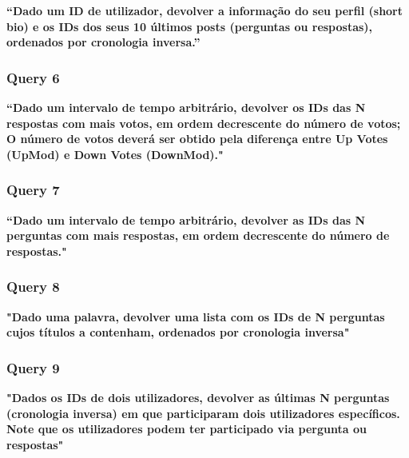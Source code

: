 \documentclass[a4paper]{article}
\begin{document}
\textbf{“Dado um ID de utilizador,  devolver a informação do
seu perfil (short bio) e os IDs dos seus 10 últimos posts (perguntas ou respostas),
ordenados por cronologia inversa.”}

\vspace{0.1cm}


\subsubsection*{Query 6}
\label{sec:query6}

\textbf{“Dado um intervalo de tempo arbitrário, devolver os IDs das N respostas
com mais votos, em ordem decrescente do número de votos; O número de votos deverá
ser obtido pela diferença entre Up Votes (UpMod) e Down Votes (DownMod)."}

\vspace{0.1cm}

\subsubsection*{Query 7}
\label{sec:query7}

\textbf{“Dado um intervalo de tempo arbitrário, devolver as IDs das N perguntas
com mais respostas, em ordem decrescente do número de respostas."}

\vspace{0.1cm}


\subsubsection*{Query 8}
\label{sec:query8}

\textbf{"Dado uma palavra, devolver uma lista com os IDs de
N perguntas cujos títulos a contenham, ordenados por cronologia inversa"}

\vspace{0.1cm}



\subsubsection*{Query 9}
\label{sec:query9}

\textbf{"Dados os IDs de dois utilizadores, devolver as últimas
N perguntas (cronologia inversa) em que participaram dois utilizadores específicos.
Note que os utilizadores podem ter participado via pergunta ou respostas"}

\vspace{0.1cm}
\end{document}
